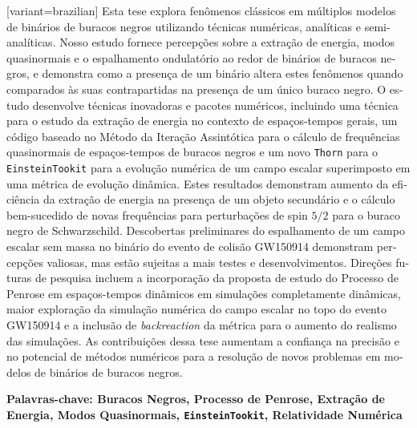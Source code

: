 \documentclass[12pt, twoside]{report}
\begin{document}
\begin{portuguese}[variant=brazilian]
  Esta tese explora fenômenos clássicos em múltiplos modelos de binários de buracos negros utilizando técnicas numéricas, analíticas e semi-analíticas. Nosso estudo fornece percepções sobre a extração de energia, modos quasinormais e o espalhamento ondulatório ao redor de binários de buracos negros, e demonstra como a presença de um binário altera estes fenômenos quando comparados às suas contrapartidas na presença de um único buraco negro. O estudo desenvolve técnicas inovadoras e pacotes numéricos, incluindo uma técnica para o estudo da extração de energia no contexto de espaços-tempos gerais, um código baseado no Método da Iteração Assintótica para o cálculo de frequências quasinormais de espaços-tempos de buracos negros e um novo \texttt{Thorn} para o \texttt{EinsteinTookit} para a evolução numérica de um campo escalar superimposto em uma métrica de evolução dinâmica. Estes resultados demonstram aumento da eficiência da extração de energia na presença de um objeto secundário e o cálculo bem-sucedido de novas frequências para perturbações de spin $5/2$ para o buraco negro de Schwarzschild. Descobertas preliminares do espalhamento de um campo escalar sem massa no binário do evento de colisão GW150914 demonstram percepções valiosas, mas estão sujeitas a mais testes e desenvolvimentos. Direções futuras de pesquisa incluem a incorporação da proposta de estudo do Processo de Penrose em espaços-tempos dinâmicos em simulações completamente dinâmicas, maior exploração da simulação numérica do campo escalar no topo do evento GW150914 e a inclusão de \textit{backreaction} da métrica para o aumento do realismo das simulações. As contribuições dessa tese aumentam a confiança na precisão e no potencial de métodos numéricos para a resolução de novos problemas em modelos de binários de buracos negros.
\end{portuguese}

\vspace{0.5cm}


\textbf{\textportuguese{Palavras-chave: Buracos Negros, Processo de Penrose, Extração de Energia, Modos Quasinormais, \texttt{EinsteinTookit}, Relatividade Numérica}}

\begin{center}
  {\large{}\thispagestyle{empty}}{\large\par}
  \par\end{center}
\end{document}
